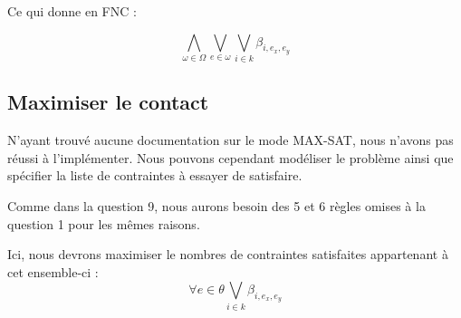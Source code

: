 \documentclass[a4paper]{article}
\begin{document}
Ce qui donne en FNC :

$$
\bigwedge_{\omega \in \Omega} \bigvee_{e \in \omega} \bigvee_{i \in k} \beta_{i, e_x, e_y}
$$



\subsection{Maximiser le contact}

N'ayant trouvé aucune documentation sur le mode MAX-SAT, nous n'avons pas réussi à l'implémenter.
Nous pouvons cependant modéliser le problème ainsi que spécifier la liste de contraintes à essayer de satisfaire.


Comme dans la question 9, nous aurons besoin des 5 et 6 règles omises à la question 1 pour les mêmes raisons.

Ici, nous devrons maximiser le nombres de contraintes satisfaites appartenant à cet ensemble-ci :
$$
  \forall e \in \theta \bigvee_{i \in k} \beta_{i, e_x, e_y}
$$
\end{document}
